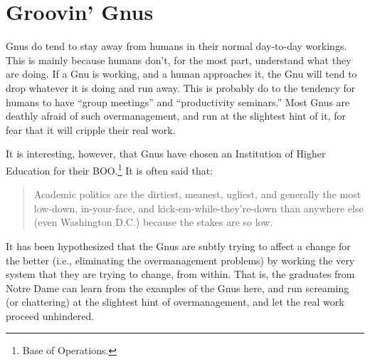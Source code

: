 \section{Groovin' Gnus}
\label{sec:groovin-gnus}

Gnus do tend to stay away from humans in their normal day-to-day
workings.  This is mainly because humans don't, for the most part,
understand what they are doing.  If a Gnu is working, and a human
approaches it, the Gnu will tend to drop whatever it is doing and run
away.  This is probably do to the tendency for humans to have ``group
meetings'' and ``productivity seminars.''  Most Gnus are deathly
afraid of such overmanagement, and run at the slightest hint of it,
for fear that it will cripple their real work.

It is interesting, however, that Gnus have chosen an Institution of
Higher Education for their BOO.\footnote{Base of Operations.}  It is
often said that:
\begin{quote}
  Academic politics are the dirtiest, meanest, ugliest, and generally
  the most low-down, in-your-face, and kick-em-while-they're-down than
  anywhere else (even Washington D.C.)  because the stakes are so low.
\end{quote}
It has been hypothesized that the Gnus are subtly trying to affect a
change for the better (i.e., eliminating the overmanagement problems)
by working the very system that they are trying to change, from
within.  That is, the graduates from Notre Dame can learn from the
examples of the Gnus here, and run screaming (or chattering) at the
slightest hint of overmanagement, and let the real work proceed
unhindered.

%
% 
% 
